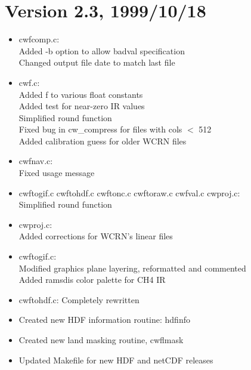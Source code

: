 

\section*{Version 2.3, 1999/10/18}

\begin{itemize}

  \item cwfcomp.c:\\ 
   Added -b option to allow badval specification\\ 
   Changed output file date to match last file 

  \item cwf.c:\\ 
   Added f to various float constants\\ 
   Added test for near-zero IR values\\ 
   Simplified round function\\ 
   Fixed bug in cw\_compress for files with cols $<$ 512\\ 
   Added calibration guess for older WCRN files 

  \item cwfnav.c:\\ 
   Fixed usage message 

  \item cwftogif.c cwftohdf.c cwftonc.c cwftoraw.c cwfval.c cwproj.c:\\ 
   Simplified round function 

  \item cwproj.c:\\ 
   Added corrections for WCRN's linear files 

  \item cwftogif.c: \\ 
  Modified graphics plane layering, reformatted and commented\\ 
  Added ramsdis color palette for CH4 IR 

  \item cwftohdf.c: Completely rewritten

  \item Created new HDF information routine: hdfinfo

  \item Created new land masking routine, cwflmask

  \item Updated Makefile for new HDF and netCDF releases

\end{itemize}


